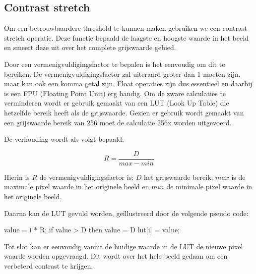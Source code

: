 \subsection{Contrast stretch}

Om een betrouwbaardere threshold te kunnen maken gebruiken we een contrast stretch
operatie. Deze functie bepaald de laagste en hoogste waarde in het beeld en smeert
deze uit over het complete grijswaarde gebied.

Door een vermenigvuldigingsfactor te bepalen is het eenvoudig om dit te
bereiken. De vermenigvuldigingsfactor zal uiteraard groter dan 1 moeten zijn,
maar kan ook een komma getal zijn. Float operaties zijn dus essentieel en
daarbij is een FPU (Floating Point Unit) erg handig. Om de zware calculaties te
verminderen wordt er gebruik gemaakt van een LUT (Look Up Table) die hetzelfde
bereik heeft als de grijswaarde. Gezien er gebruik wordt gemaakt van een
grijswaarde bereik van 256 moet de calculatie 256x worden uitgevoerd.

De verhouding wordt als volgt bepaald:

\[ R = \frac{D}{max - min} \]

Hierin is $R$ de vermenigvuldigingsfactor is; $D$ het grijswaarde bereik; $max$
is de maximale pixel waarde in het originele beeld en $min$ de minimale pixel
waarde in het originele beeld.

Daarna kan de LUT gevuld worden, geïllustreerd door de volgende pseudo code:

\begin{cppcode}
    value = i * R;
    if value > D then value = D
    lut[i] = value;
\end{cppcode}

Tot slot kan er eenvoudig vanuit de huidige waarde in de LUT de nieuwe pixel
waarde worden opgevraagd. Dit wordt over het hele beeld gedaan om een verbeterd
contrast te krijgen.

